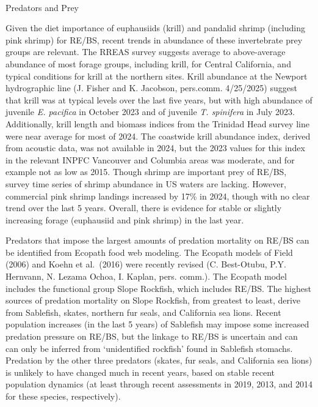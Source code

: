 \documentclass[
]{scrartcl}
\makeatletter
\let\oldparagraph\paragraph
\renewcommand{\paragraph}{
    \@ifstar
      \xxxParagraphStar
      \xxxParagraphNoStar
  }
\newcommand{\xxxParagraphStar}[1]{\oldparagraph*{#1}\mbox{}}
\newcommand{\xxxParagraphNoStar}[1]{\oldparagraph{#1}\mbox{}}
\makeatother
\begin{document}
\paragraph{Predators and Prey}\label{predators-and-prey}

Given the diet importance of euphausiids (krill) and pandalid shrimp
(including pink shrimp) for RE/BS, recent trends in abundance of these
invertebrate prey groups are relevant. The RREAS survey suggests average
to above-average abundance of most forage groups, including krill, for
Central California, and typical conditions for krill at the northern
sites. Krill abundance at the Newport hydrographic line (J. Fisher and
K. Jacobson, pers.comm. 4/25/2025) suggest that krill was at typical
levels over the last five years, but with high abundance of juvenile
\emph{E. pacifica} in October 2023 and of juvenile \emph{T. spinifera}
in July 2023. Additionally, krill length and biomass indices from the
Trinidad Head survey line were near average for most of 2024. The
coastwide krill abundance index, derived from acoustic data, was not
available in 2024, but the 2023 values for this index in the relevant
INPFC Vancouver and Columbia areas was moderate, and for example not as
low as 2015. Though shrimp are important prey of RE/BS, survey time
series of shrimp abundance in US waters are lacking. However, commercial
pink shrimp landings increased by 17\% in 2024, though with no clear
trend over the last 5 years. Overall, there is evidence for stable or
slightly increasing forage (euphausiid and pink shrimp) in the last
year.

Predators that impose the largest amounts of predation mortality on
RE/BS can be identified from Ecopath food web modeling. The Ecopath
models of Field (2006) and Koehn et al.~(2016) were recently revised (C.
Best-Otubu, P.Y. Hernvann, N. Lezama Ochoa, I. Kaplan, pers. comm.). The
Ecopath model includes the functional group Slope Rockfish, which
includes RE/BS. The highest sources of predation mortality on Slope
Rockfish, from greatest to least, derive from Sablefish, skates,
northern fur seals, and California sea lions. Recent population
increases (in the last 5 years) of Sablefish may impose some increased
predation pressure on RE/BS, but the linkage to RE/BS is uncertain and
can can only be inferred from `unidentified rockfish' found in Sablefish
stomachs. Predation by the other three predators (skates, fur seals, and
California sea lions) is unlikely to have changed much in recent years,
based on stable recent population dynamics (at least through recent
assessments in 2019, 2013, and 2014 for these species, respectively).
\end{document}
